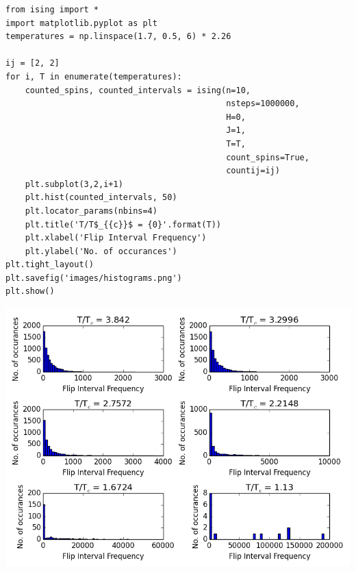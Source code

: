 \documentclass{article}
\begin{document}
\begin{verbatim}
from ising import *
import matplotlib.pyplot as plt
temperatures = np.linspace(1.7, 0.5, 6) * 2.26

ij = [2, 2]
for i, T in enumerate(temperatures):
    counted_spins, counted_intervals = ising(n=10,
                                             nsteps=1000000,
                                             H=0,
                                             J=1,
                                             T=T, 
                                             count_spins=True,
                                             countij=ij)
    plt.subplot(3,2,i+1)
    plt.hist(counted_intervals, 50)
    plt.locator_params(nbins=4)
    plt.title('T/T$_{{c}}$ = {0}'.format(T))
    plt.xlabel('Flip Interval Frequency')
    plt.ylabel('No. of occurances')
plt.tight_layout()
plt.savefig('images/histograms.png')
plt.show()
\end{verbatim}

\includegraphics[width=.9\linewidth]{./images/histograms.png}
\end{document}
